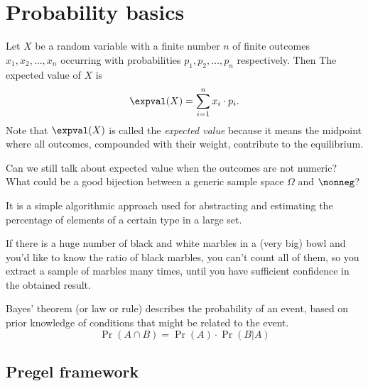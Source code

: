\section{Probability basics}
    
\begin{defn}\label{def:expected-value}
    Let $X$ be a random variable with a finite number $n$ of finite outcomes $x_1, x_2, \ldots, x_n$ occurring with probabilities $p_1, p_2, \ldots, p_n$ respectively. Then The expected value of $X$ is
    \begin{equation}
        \expval(X) = \sum_{i = 1}^{n} x_i \cdot p_i.
    \end{equation}
    Note that $\expval(X)$ is called the \textit{expected value} because it means the midpoint where all outcomes, compounded with their weight, contribute to the equilibrium.
    
    \begin{qst}
        Can we still talk about expected value when the outcomes are not numeric? What could be a good bijection between a generic sample space $\Omega$ and $\nonneg$?
    \end{qst}
\end{defn}

\begin{defn}[Sampling]\label{def:sampling}
    It is a simple algorithmic approach used for abstracting and estimating the percentage of elements of a certain type in a large set.
    
    \ex If there is a huge number of black and white marbles in a (very big) bowl and you'd like to know the ratio of black marbles, you can't count all of them, so you extract a sample of marbles many times, until you have sufficient confidence in the obtained result.
\end{defn}

\begin{defn}
    Bayes’ theorem (or law or rule) describes the probability of an event, based on prior knowledge of conditions that might be related to the event.
    \begin{equation}\label{eq-bayes}
        \Pr{(A \cap B)} = \Pr{(A)} \cdot \Pr{(B | A)}
    \end{equation}
\end{defn}


\subsection{Pregel framework}

